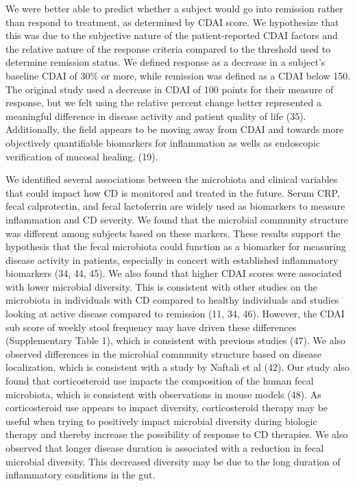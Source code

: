\documentclass[12pt,]{article}
\begin{document}
We were better able to predict whether a subject would go into remission
rather than respond to treatment, as determined by CDAI score. We
hypothesize that this was due to the subjective nature of the
patient-reported CDAI factors and the relative nature of the response
criteria compared to the threshold used to determine remission status.
We defined response as a decrease in a subject's baseline CDAI of 30\%
or more, while remission was defined as a CDAI below 150. The original
study used a decrease in CDAI of 100 points for their measure of
response, but we felt using the relative percent change better
represented a meaningful difference in disease activity and patient
quality of life (35). Additionally, the field appears to be moving away
from CDAI and towards more objectively quantifiable biomarkers for
inflammation as wells as endoscopic verification of mucosal healing.
(19).

We identified several associations between the microbiota and clinical
variables that could impact how CD is monitored and treated in the
future. Serum CRP, fecal calprotectin, and fecal lactoferrin are widely
used as biomarkers to measure inflammation and CD severity. We found
that the microbial community structure was different among subjects
based on these markers. These results support the hypothesis that the
fecal microbiota could function as a biomarker for measuring disease
activity in patients, especially in concert with established
inflammatory biomarkers (34, 44, 45). We also found that higher CDAI
scores were associated with lower microbial diversity. This is
consistent with other studies on the microbiota in individuals with CD
compared to healthy individuals and studies looking at active disease
compared to remission (11, 34, 46). However, the CDAI sub score of
weekly stool frequency may have driven these differences (Supplementary
Table 1), which is consistent with previous studies (47). We also
observed differences in the microbial community structure based on
disease localization, which is consistent with a study by Naftali et al
(42). Our study also found that corticosteroid use impacts the
composition of the human fecal microbiota, which is consistent with
observations in mouse models (48). As corticosteroid use appears to
impact diversity, corticosteroid therapy may be useful when trying to
positively impact microbial diversity during biologic therapy and
thereby increase the possibility of response to CD therapies. We also
observed that longer disease duration is associated with a reduction in
fecal microbial diversity. This decreased diversity may be due to the
long duration of inflammatory conditions in the gut.
\end{document}
